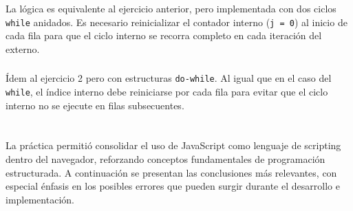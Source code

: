 \documentclass[10pt,a4paper]{article}
\begin{document}
\subsubsection{}

La lógica es equivalente al ejercicio anterior, pero implementada con dos ciclos \texttt{while} anidados. Es necesario reinicializar el contador interno (\texttt{j = 0}) al inicio de cada fila para que el ciclo interno se recorra completo en cada iteración del externo.

\subsubsection{}

Ídem al ejercicio 2 pero con estructuras \texttt{do-while}. Al igual que en el caso del \texttt{while}, el índice interno debe reiniciarse por cada fila para evitar que el ciclo interno no se ejecute en filas subsecuentes.

\section{\color{colorIPN}{Conclusiones}}

La práctica permitió consolidar el uso de JavaScript como lenguaje de scripting dentro del navegador, reforzando conceptos fundamentales de programación estructurada. A continuación se presentan las conclusiones más relevantes, con especial énfasis en los posibles errores que pueden surgir durante el desarrollo e implementación.
\end{document}
